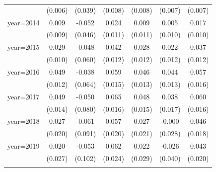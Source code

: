 \begin{table}[htbp]
\begin{tabular}{l*{6}{c}}
{                    &     (0.006)         &     (0.039)         &     (0.008)         &     (0.008)         &     (0.007)         &     (0.007)         \\
\addlinespace
year=2014           &       0.009         &      -0.052         &       0.024\sym{**} &       0.009         &       0.005         &       0.017         \\
                    &     (0.009)         &     (0.046)         &     (0.011)         &     (0.011)         &     (0.010)         &     (0.010)         \\
\addlinespace
year=2015           &       0.029\sym{***}&      -0.048         &       0.042\sym{***}&       0.028\sym{**} &       0.022\sym{*}  &       0.037\sym{***}\\
                    &     (0.010)         &     (0.060)         &     (0.012)         &     (0.012)         &     (0.012)         &     (0.012)         \\
\addlinespace
year=2016           &       0.049\sym{***}&      -0.038         &       0.059\sym{***}&       0.046\sym{***}&       0.044\sym{***}&       0.057\sym{***}\\
                    &     (0.012)         &     (0.064)         &     (0.015)         &     (0.013)         &     (0.013)         &     (0.016)         \\
\addlinespace
year=2017           &       0.049\sym{***}&      -0.050         &       0.065\sym{***}&       0.048\sym{***}&       0.038\sym{**} &       0.060\sym{***}\\
                    &     (0.014)         &     (0.080)         &     (0.016)         &     (0.015)         &     (0.017)         &     (0.016)         \\
\addlinespace
year=2018           &       0.027         &      -0.061         &       0.057\sym{***}&       0.027         &      -0.000         &       0.046\sym{**} \\
                    &     (0.020)         &     (0.091)         &     (0.020)         &     (0.021)         &     (0.028)         &     (0.018)         \\
\addlinespace
year=2019           &       0.020         &      -0.053         &       0.062\sym{**} &       0.022         &      -0.026         &       0.043\sym{**} \\
                    &     (0.027)         &     (0.102)         &     (0.024)         &     (0.029)         &     (0.040)         &     (0.020)         \\
}
\end{tabular}
\end{table}
